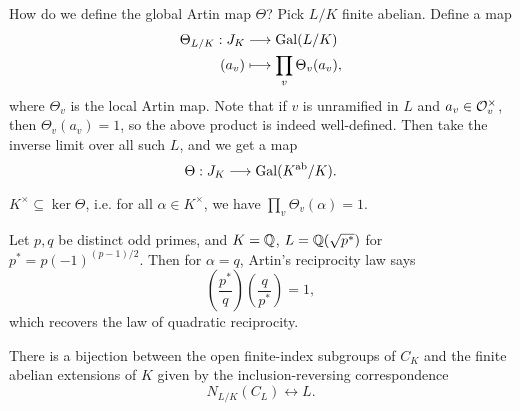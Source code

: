 \begin{remark}
  How do we define the global
  Artin map $\Theta$? Pick $L / K$ finite
  abelian. Define a map
  \begin{align*}
    \Theta_{L / K} : J_K
    &\longrightarrow \operatorname{Gal}(L / K) \\
    (a_v) &\longmapsto \prod_v \Theta_v(a_v),
  \end{align*}
  where $\Theta_v$ is the local Artin map.
  Note that if $v$ is
  unramified in $L$ and $a_v \in \mathcal{O}_v^\times$,
  then $\Theta_v(a_v) = 1$, so the
  above product is indeed well-defined. Then
  take the inverse limit over all such $L$,
  and we get a map
  \[
    \Theta : J_K \longrightarrow \operatorname{Gal}(K^\mathrm{ab} / K).
  \]
\end{remark}

\begin{theorem}
  $K^\times \subseteq \ker \Theta$, i.e.
  for all $\alpha \in K^\times$, we have
  $\prod_v \Theta_v(\alpha) = 1$.
\end{theorem}

\begin{example}
  Let $p, q$ be distinct odd primes, and
  $K = \mathbb{Q}$, $L = \mathbb{Q}(\sqrt{p^*})$ for
  $p^* = p (-1)^{(p - 1) / 2}$. Then for
  $\alpha = q$, Artin's reciprocity
  law says
  \[
    \left(\frac{p^*}{q}\right)
    \left(\frac{q}{p^*}\right) = 1,
  \]
  which recovers the law of quadratic
  reciprocity.
\end{example}

\begin{theorem}
  There is a bijection between the
  open finite-index subgroups of $C_K$
  and the finite abelian
  extensions of $K$
  given by the inclusion-reversing
  correspondence
  \[
    N_{L / K}(C_L) \longleftrightarrow L.
  \]
\end{theorem}
